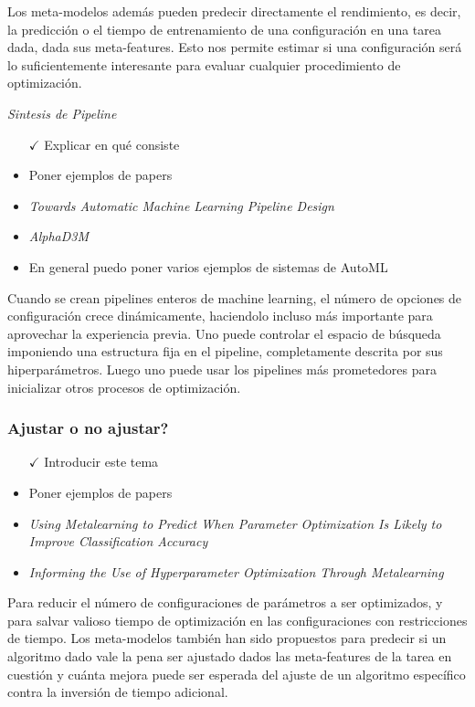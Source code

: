 Los meta-modelos además pueden predecir directamente el rendimiento, es decir, la predicción o el tiempo de entrenamiento de una configuración en una tarea dada, dada sus meta-features. Esto nos permite estimar si una configuración será lo suficientemente interesante para evaluar cualquier procedimiento de optimización.

\textit{Sintesis de \textit{Pipeline}}

\begin{itemize}
	\item[$\checkmark$] Explicar en qué consiste
	\item Poner ejemplos de papers
	\item \textit{Towards Automatic Machine Learning Pipeline Design}
	\item \textit{AlphaD3M}
	\item En general puedo poner varios ejemplos de sistemas de AutoML
\end{itemize}

Cuando se crean pipelines enteros de machine learning, el número de opciones de configuración crece dinámicamente, haciendolo incluso más importante para aprovechar la experiencia previa. Uno puede controlar el espacio de búsqueda imponiendo una estructura fija en el pipeline, completamente descrita por sus hiperparámetros. Luego uno puede usar los pipelines más prometedores para inicializar otros procesos de optimización.

\subsubsection{Ajustar o no ajustar?}

\begin{itemize}
	\item[$\checkmark$] Introducir este tema
	\item Poner ejemplos de papers
	\item \textit{Using Metalearning to Predict When Parameter Optimization Is Likely to Improve Classification Accuracy}
	\item \textit{Informing the Use of Hyperparameter Optimization Through Metalearning}
\end{itemize}

Para reducir el número de configuraciones de parámetros a ser optimizados, y para salvar valioso tiempo de optimización en las configuraciones con restricciones de tiempo. Los meta-modelos también han sido propuestos para predecir si un algoritmo dado vale la pena ser ajustado dados las meta-features de la tarea en cuestión y cuánta mejora puede ser esperada del ajuste de un algoritmo específico contra la inversión de tiempo adicional.

